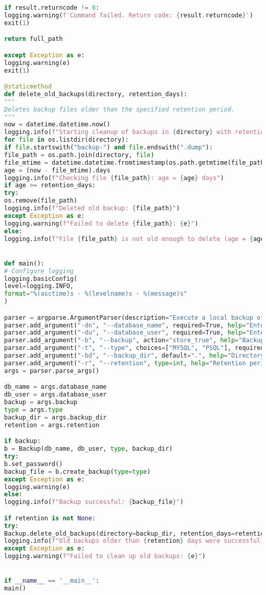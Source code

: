\begin{lstlisting}[language=Python, caption={Python-script voor back-ups en retentiebeleid.}]
if result.returncode != 0:
logging.warning(f'Command failed. Return code: {result.returncode}')
exit(1)

return full_path

except Exception as e:
logging.warning(e)
exit(1)

@staticmethod
def delete_old_backups(directory, retention_days):
"""
Deletes backup files older than the specified retention period.
"""
now = datetime.datetime.now()
logging.info(f"Starting cleanup of backups in {directory} with retention period: {retention_days} days")
for file in os.listdir(directory):
if file.startswith("backup-") and file.endswith(".dump"):
file_path = os.path.join(directory, file)
file_mtime = datetime.datetime.fromtimestamp(os.path.getmtime(file_path))
age = (now - file_mtime).days
logging.info(f"Checking file {file_path}: age = {age} days")
if age >= retention_days:
try:
os.remove(file_path)
logging.info(f"Deleted old backup: {file_path}")
except Exception as e:
logging.warning(f"Failed to delete {file_path}: {e}")
else:
logging.info(f"File {file_path} is not old enough to delete (age = {age} days).")


def main():
# Configure logging
logging.basicConfig(
level=logging.INFO,
format="%(asctime)s - %(levelname)s - %(message)s"
)

parser = argparse.ArgumentParser(description="Execute a local backup of a database.")
parser.add_argument("-dn", "--database_name", required=True, help="Enter the name of the database for the backup.")
parser.add_argument("-du", "--database_user", required=True, help="Enter the username of the database for the backup.")
parser.add_argument("-b", "--backup", action="store_true", help="Backup the database.")
parser.add_argument("-t", "--type", choices=["MYSQL", "PSQL"], required=True, help="MYSQL or PSQL")
parser.add_argument("-bd", "--backup_dir", default=".", help="Directory where backups are stored.")
parser.add_argument("-r", "--retention", type=int, help="Retention period in days for keeping backups.")
args = parser.parse_args()

db_name = args.database_name
db_user = args.database_user
backup = args.backup
type = args.type
backup_dir = args.backup_dir
retention = args.retention

if backup:
b = Backup(db_name, db_user, type, backup_dir)
try:
b.set_password()
backup_file = b.create_backup(type=type)
except Exception as e:
logging.warning(e)
else:
logging.info(f"Backup successful: {backup_file}")

if retention is not None:
try:
Backup.delete_old_backups(directory=backup_dir, retention_days=retention)
logging.info(f"Old backups older than {retention} days were successfully deleted from {backup_dir}.")
except Exception as e:
logging.warning(f"Failed to clean up old backups: {e}")


if __name__ == '__main__':
main()
\end{lstlisting}

